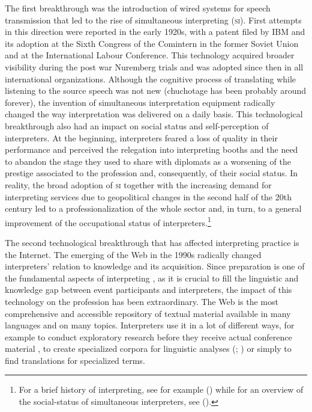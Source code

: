 \documentclass[output=paper]{langsci/langscibook}
\begin{document}
The first breakthrough was the introduction of wired systems for speech transmission that led to the rise of simultaneous interpreting (\textsc{si}). First attempts in this direction were reported in the early 1920s, with a patent filed by IBM and its adoption at the Sixth Congress of the Comintern in the former Soviet Union and at the International Labour Conference. This technology acquired broader visibility during the post war Nuremberg trials and was adopted since then in all international organizations. Although the cognitive process of translating while listening to the source speech was not new (chuchotage has been probably around forever), the invention of simultaneous interpretation equipment radically changed the way interpretation was delivered on a daily basis. This technological breakthrough also had an impact on social status and self-perception of interpreters. At the beginning, interpreters feared a loss of quality in their performance and perceived the relegation into interpreting booths and the need to abandon the stage they used to share with diplomats as a worsening of the prestige associated to the profession and, consequently, of their social status. In reality, the broad adoption of \textsc{si} together with the increasing demand for interpreting services due to geopolitical changes in the second half of the 20th century led to a professionalization of the whole sector and, in turn, to a general improvement of the occupational status of interpreters.\footnote{For a brief history of interpreting, see for example \citeauthor{takeda_new_2016} (\citeyear{takeda_new_2016}) while for an overview of the social-status of simultaneous interpreters, see \citeauthor{Gentile2013} (\citeyear{Gentile2013}).} 
 
The second technological breakthrough that has affected interpreting practice is the Internet. The emerging of the Web in the 1990s radically changed interpreters’ relation to knowledge and its acquisition. Since preparation is one of the fundamental aspects of interpreting \citep{Gile2009}, as it is crucial to fill the linguistic and knowledge gap between event participants and interpreters, the impact of this technology on the profession has been extraordinary. The Web is the most comprehensive and accessible repository of textual material available in many languages and on many topics. Interpreters use it in a lot of different ways, for example to conduct exploratory research before they receive actual conference material \citep{chang_conference_2018}, to create specialized corpora for linguistic analyses (\citealt{Fantinuoli2017a,Fantinuoli2018c}; \citealt{xu_corpus-based_2018}) or simply to find translations for specialized terms.\largerpage[-1]
\end{document}
